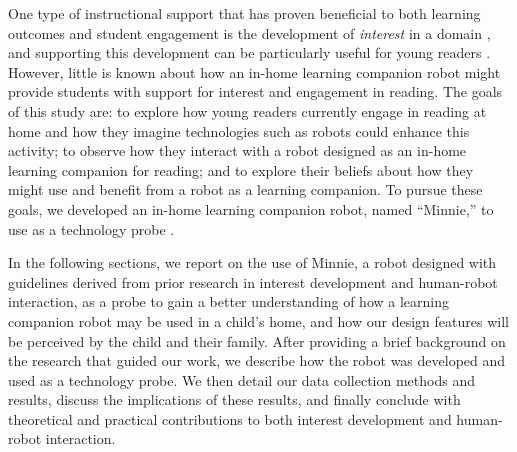 \documentclass{sigchi}
\begin{document}
One type of instructional support that has proven beneficial to both learning outcomes and student engagement is the development of \textit{interest} in a domain \cite{Hidi:2006}, and supporting this development can be particularly useful for young readers \cite{Jones:2011}. However, little is known about how an in-home learning companion robot might provide students with support for interest and engagement in reading. {\color{blue}The goals of this study are:} to explore how young readers currently engage in reading at home and how they imagine technologies such as robots could enhance this activity; to observe how they interact with a robot designed as an in-home learning companion for reading; and to explore their beliefs about how they might use and benefit from a robot as a learning companion. To pursue these goals, we developed an in-home learning companion robot, named ``Minnie,'' to use as a technology probe \cite{Hutchinson:2003}.


In the following sections, we report on the use of Minnie, a robot designed with guidelines derived from prior research in interest development and human-robot interaction, as a probe to gain a better understanding of how a learning companion robot may be used in a child's home, and how our design features will be perceived by the child and their family. After providing a brief background on the research that guided our work, we describe how the robot was developed and used as a technology probe. We then detail our data collection methods and results, discuss the implications of these results, and finally conclude with theoretical and practical contributions to both interest development and human-robot interaction.
\end{document}

